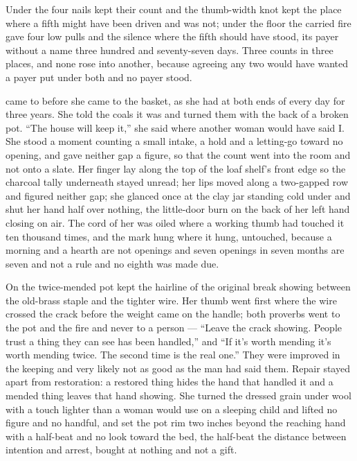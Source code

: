 Under  the four nails kept their count and the thumb-width knot kept the place where a fifth might have been driven and was not; under the floor the carried fire gave four low pulls and the silence where the fifth should have stood, its payer without a name three hundred and seventy-seven days. Three counts in three places, and none rose into another, because agreeing any two would have wanted a payer put under both and no payer stood.

\scenebreak

 came to  before she came to the basket, as she had at both ends of every day for three years. She told the coals it was  and turned them with the back of a broken pot. “The house will keep it,” she said where another woman would have said I. She stood a moment counting a small intake, a hold and a letting-go toward no opening, and gave neither gap a figure, so that the count went into the room and not onto a slate. Her finger lay along the top of the loaf shelf's front edge so the charcoal tally underneath stayed unread; her lips moved along a two-gapped row and figured neither gap; she glanced once at the clay jar standing cold under  and shut her hand half over nothing, the little-door burn on the back of her left hand closing on air. The cord of her  was oiled where a working thumb had touched it ten thousand times, and the mark hung where it hung, untouched, because a morning and a hearth are not openings and seven openings in seven months are seven and not a rule and no eighth was made due.

On  the twice-mended pot kept the hairline of the original break showing between the old-brass staple and the tighter wire. Her thumb went first where the wire crossed the crack before the weight came on the handle; both proverbs went to the pot and the fire and never to a person — “Leave the crack showing. People trust a thing they can see has been handled,” and “If it's worth mending it's worth mending twice. The second time is the real one.” They were improved in the keeping and very likely not as good as the man had said them. Repair stayed apart from restoration: a restored thing hides the hand that handled it and a mended thing leaves that hand showing. She turned the dressed grain under wool with a touch lighter than a woman would use on a sleeping child and lifted no figure and no handful, and set the pot rim two inches beyond the reaching hand with a half-beat and no look toward the bed, the half-beat the distance between intention and arrest, bought at nothing and not a gift.

